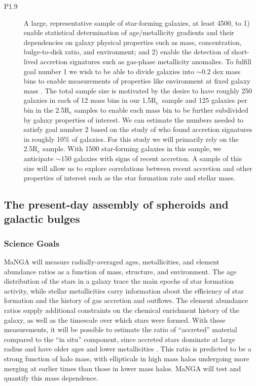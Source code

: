 \documentclass[preprint,11pt]{aastex}
\begin{document}
\begin{description}
\item[P1.9] A large, representative sample of star-forming galaxies, at least 4500,
  to 1) enable statistical determination of age/metallicity gradients and
  their dependencies on galaxy physical properties such as mass,
  concentration, bulge-to-disk ratio, and environment; and 2) enable
  the detection of short-lived accretion signatures such as gas-phase
  metallicity anomalies.  To fulfill goal number 1 we wish to be able
  to divide galaxies into $\sim0.2$ dex mass bins to enable
  measurements of properties like environment at fixed galaxy mass
  \citep[c.f.,][]{peng13}. The total sample size is motivated by the
  desire to have roughly 250 galaxies in each of 12 mass bins in our
  1.5R$_e$\ sample and 125 galaxies per bin in the 2.5R$_e$ samples 
  to enable each mass bin to be further
  subdivided by galaxy properties of interest.  We can estimate the
  numbers needed to satisfy goal number 2 based on the study of
  \citet{moran12} who found accretion signatures in roughly 10\% of
  galaxies.  For this study we will primarily rely on the 2.5R$_e$
  sample.  With 1500 star-forming galaxies in this sample, we anticipate $\sim150$
  galaxies with signs of recent accretion.  A sample of this size will
  allow us to explore correlations between recent accretion and other
  properties of interest such as the star formation rate and stellar mass.


\end{description}


\subsection{The present-day assembly of spheroids and galactic bulges}
\label{sec:growth_bulges}

\subsubsection{Science Goals}

MaNGA will measure radially-averaged ages, metallicities, and element
abundance ratios as a function of mass, structure, and environment.
The age distribution of the stars in a galaxy trace the main epochs of
star formation activity, while stellar metallicities carry information
about the efficiency of star formation and the history of gas
accretion and outflows. The element abundance ratios supply additional
constraints on the chemical enrichment history of the galaxy, as well
as the timescale over which stars were formed.  With these
measurements, it will be possible to estimate the ratio of
``accreted'' material compared to the ``in situ'' component, since
accreted stars dominate at large radius and have older ages and
lower metallicities \citep{lackner12}. This
ratio is predicted to be a strong function of halo mass, with
ellipticals in high mass halos undergoing more merging at earlier
times than those in lower mass halos.  MaNGA will test and quantify
this mass dependence.
\end{document}
